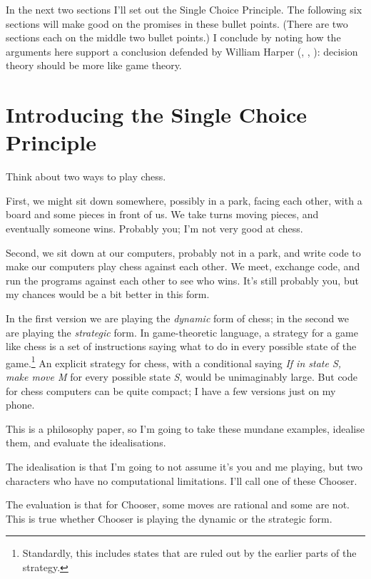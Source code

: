 \documentclass[
  10pt,
  letterpaper,
  DIV=11,
  numbers=noendperiod,
  twoside]{scrartcl}
\begin{document}
In the next two sections I'll set out the Single Choice Principle. The
following six sections will make good on the promises in these bullet
points. (There are two sections each on the middle two bullet points.) I
conclude by noting how the arguments here support a conclusion defended
by William Harper (,
, ):
decision theory should be more like game theory.

\section{Introducing the Single Choice Principle}\label{sec-scp-intro}

Think about two ways to play chess.

First, we might sit down somewhere, possibly in a park, facing each
other, with a board and some pieces in front of us. We take turns moving
pieces, and eventually someone wins. Probably you; I'm not very good at
chess.

Second, we sit down at our computers, probably not in a park, and write
code to make our computers play chess against each other. We meet,
exchange code, and run the programs against each other to see who wins.
It's still probably you, but my chances would be a bit better in this
form.

In the first version we are playing the \emph{dynamic} form of chess; in
the second we are playing the \emph{strategic} form. In game-theoretic
language, a strategy for a game like chess is a set of instructions
saying what to do in every possible state of the game.\footnote{Standardly,
  this includes states that are ruled out by the earlier parts of the
  strategy.} An explicit strategy for chess, with a conditional saying
\emph{If in state S, make move M} for every possible state \emph{S},
would be unimaginably large. But code for chess computers can be quite
compact; I have a few versions just on my phone.

This is a philosophy paper, so I'm going to take these mundane examples,
idealise them, and evaluate the idealisations.

The idealisation is that I'm going to not assume it's you and me
playing, but two characters who have no computational limitations. I'll
call one of these Chooser.

The evaluation is that for Chooser, some moves are rational and some are
not. This is true whether Chooser is playing the dynamic or the
strategic form.
\end{document}
